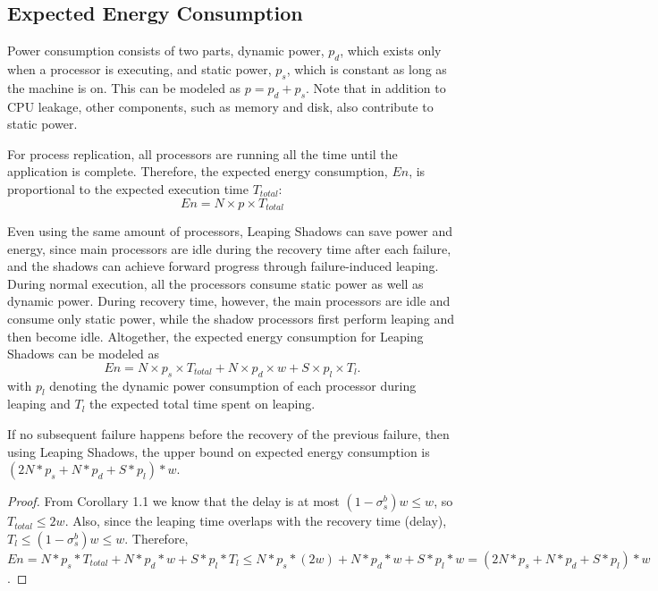 \subsection{Expected Energy Consumption}
\label{sec:anal_energy}
Power consumption consists of two parts, dynamic power, $p_d$, which exists only when a processor is executing, and static power, $p_s$, which is constant as long as the machine is on. This can be modeled as $p = p_d + p_s$. Note that in addition to CPU leakage, other components, such as memory and disk, also contribute to static power. 

For process replication, all processors are running all the time until the application is complete. Therefore, the expected energy consumption, $En$, is proportional to the expected execution time $T_{total}$: 
\begin{equation}
En = N \times p \times T_{total}
\label{eq:exp_energy1}
\end{equation} 

Even using the same amount of processors, Leaping Shadows can save power and energy, since main processors are idle during the recovery time after each failure, and the shadows can achieve forward progress through failure-induced leaping. During normal execution, all the processors consume static power as well as dynamic power. During recovery time, however, the main processors are idle and consume only static power, while the shadow processors first perform leaping and then become idle. Altogether, the expected energy consumption for Leaping Shadows can be modeled as 
\begin{equation}
En = N \times p_s \times T_{total} + N \times p_d \times w + S \times p_{l} \times T_l.
\label{eq:exp_energy2}
\end{equation}
with $p_{l}$ denoting the dynamic power consumption of each processor during leaping and $T_l$ the expected total time spent on leaping. 

\begin{theorem}
If no subsequent failure happens before the recovery of the previous failure, then using Leaping Shadows, the upper bound on expected energy consumption is
$(2N * p_s + N * p_d + S * p_{l})*w$.
\end{theorem}
\begin{proof}
From Corollary 1.1 we know that the delay is at most $(1-\sigma_s^b)w \le w$, so $T_{total} \le 2w$. Also, since the leaping time overlaps with the recovery time (delay), $T_l \le (1-\sigma_s^b)w \le w$. Therefore, $En = N * p_s * T_{total} + N * p_d * w + S * p_{l} * T_l \le N * p_s * (2w) + N * p_d * w + S * p_{l} * w = (2N * p_s + N * p_d + S * p_{l})*w$.
\end{proof}











